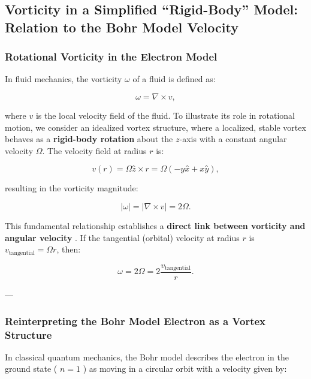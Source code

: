 

\subsection{Vorticity in a Simplified “Rigid-Body” Model: Relation to the Bohr Model Velocity}

\subsubsection*{Rotational Vorticity in the Electron Model}

In fluid mechanics, the vorticity \( \omega \) of a fluid is defined as:

\begin{equation*}
    \omega = \nabla \times v,
\end{equation*}

where \( v \) is the local velocity field of the fluid. To illustrate its role in rotational motion, we consider an idealized vortex structure, where a localized, stable vortex behaves as a \textbf{rigid-body rotation} about the \( z \)-axis with a constant angular velocity \( \Omega \). The velocity field at radius \( r \) is:

\begin{equation*}
    v(r) = \Omega ẑ \times r = \Omega(-yx̂ + xŷ),
\end{equation*}

resulting in the vorticity magnitude:

\begin{equation*}
    |\omega| = |\nabla \times v| = 2\Omega.
\end{equation*}

This fundamental relationship establishes a \textbf{direct link between vorticity and angular velocity} \cite{lamb_hydrodynamics, feynman_qed}. If the tangential (orbital) velocity at radius \( r \) is \( v_{\text{tangential}} = \Omega r \), then:

\begin{equation*}
    \omega = 2\Omega = 2\frac{v_{\text{tangential}}}{r}.
\end{equation*}

---

\subsubsection*{Reinterpreting the Bohr Model Electron as a Vortex Structure}

In classical quantum mechanics, the Bohr model describes the electron in the ground state ( \( n = 1 \) ) as moving in a circular orbit with a velocity given by:

